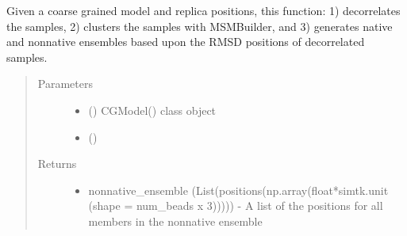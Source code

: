 \documentclass[letterpaper,12pt,english,openany,oneside]{sphinxmanual}
\begin{document}

\begin{fulllineitems}
\label{\detokenize{ensembles:ensembles.ens_build.get_ensembles_from_replica_positions}}
Given a coarse grained model and replica positions, this function: 1) decorrelates the samples, 2) clusters the samples with MSMBuilder, and 3) generates native and nonnative ensembles based upon the RMSD positions of decorrelated samples.
\begin{quote}\begin{description}
\item[{Parameters}] \leavevmode\begin{itemize}
\item {} 
 () \textendash{} CGModel() class object

\item {} 
 (\sphinxstyleliteralemphasis{\sphinxupquote{( }}\sphinxstyleliteralemphasis{\sphinxupquote{(}}\sphinxstyleliteralemphasis{\sphinxupquote{ (}}\sphinxstyleliteralemphasis{\sphinxupquote{)}}\sphinxstyleliteralemphasis{\sphinxupquote{)}}\sphinxstyleliteralemphasis{\sphinxupquote{)}}\sphinxstyleliteralemphasis{\sphinxupquote{)}}) \textendash{} 

\end{itemize}

\item[{Returns}] \leavevmode
\begin{itemize}
\item {} 
nonnative\_ensemble (List(positions(np.array(float*simtk.unit (shape = num\_beads x 3))))) - A list of the positions for all members in the nonnative ensemble


\end{itemize}
\end{description}
\end{quote}
\end{fulllineitems}
\end{document}
